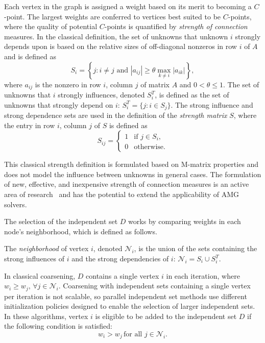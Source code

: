 \documentclass{elsart}
\begin{document}
Each vertex in the graph is assigned a weight based on its merit to
becoming a $C$-point. The largest weights are conferred to vertices
best suited to be $C$-points, where the quality of potential
$C$-points is quantified by \emph{strength of connection} measures. In
the classical definition, the set of unknowns that unknown $i$
strongly depends upon is based on the relative sizes of off-diagonal
nonzeros in row $i$ of $A$ and is defined as
\begin{equation}
\label{2:eqn:S_i}
S_i = \left\{j: i \ne j \textrm{ and }|a_{ij}| \ge \theta \max_{k \ne
i}|a_{ik}|\right\},
\end{equation}
where $a_{ij}$ is the nonzero in row $i$, column $j$ of matrix $A$ and
$0 < \theta \le 1$. The set of unknowns that $i$ strongly influences,
denoted $S_i^T$, is defined as the set of unknowns that strongly
depend on $i$: $S_i^T = \{j: i \in S_j\}$. The strong influence and
strong dependence sets are used in the definition of the
\emph{strength matrix} $S$, where the entry in row $i$, column $j$ of
$S$ is defined as
\begin{equation}
S_{ij} = \left\{
\begin{array}{ll}
  1 & \textrm{if } j \in S_i, \\
  0 & \textrm{otherwise}.
\end{array}\right.
\end{equation}

This classical strength definition is formulated based on M-matrix
properties and does not model the influence between unknowns in
general cases. The formulation of new, effective, and inexpensive
strength of connection measures is an active area of
research~\cite{Brannick2005} and has the potential to extend the
applicability of AMG solvers.

The selection of the independent set $D$ works by comparing weights in
each node's neighborhood, which is defined as follows.
\begin{defn}
\label{def:neighborhood}
The \emph{neighborhood} of vertex $i$, denoted $\mathcal{N}_i$, is the
union of the sets containing the strong influences of $i$ and the
strong dependencies of $i$: $\mathcal{N}_i = S_i \cup S_i^T$.
\end{defn}

In classical coarsening, $D$ contains a single vertex $i$ in each
iteration, where $w_i \ge w_j,\, \forall j \in
\mathcal{N}_i$. Coarsening with independent sets containing a single
vertex per iteration is not scalable, so parallel independent set
methods use different initialization policies designed to enable the
selection of larger independent sets. In these algorithms, vertex $i$
is eligible to be added to the independent set $D$ if the following
condition is satisfied:
\begin{equation}
  \label{eq:D-selection}
  w_i > w_j\, \textrm{for all } j \in \mathcal{N}_i.
\end{equation}
\end{document}
